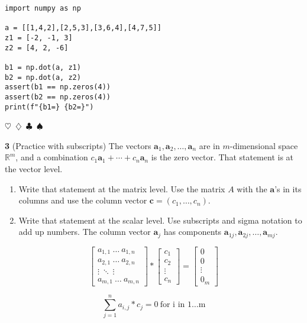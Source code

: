 \documentclass{article}
\newcommand{\sep}{\begin{center}$\heartsuit$~$\diamondsuit$~$\clubsuit$~$\spadesuit$\end{center}}
\newcommand{\vect}[1]{\ensuremath{\boldsymbol{#1}}}
\begin{document}
\begin{verbatim}
import numpy as np

a = [[1,4,2],[2,5,3],[3,6,4],[4,7,5]]
z1 = [-2, -1, 3]
z2 = [4, 2, -6]

b1 = np.dot(a, z1)
b2 = np.dot(a, z2)
assert(b1 == np.zeros(4))
assert(b2 == np.zeros(4))
print(f"{b1=} {b2=}")
\end{verbatim}

\sep

\noindent\textbf{3} (Practice with subscripts) The vectors $\vect{a}_1, \vect{a}_2, \ldots , \vect{a}_n$ are in $m$-dimensional space $\mathbb{R}^m$, and a combination $c_1\vect{a}_1 + \cdots + c_n\vect{a}_n$ is the zero vector. That statement is at the vector level. 
\begin{enumerate}[label=(\arabic*)]
\item Write that statement at the matrix level. Use the matrix $A$ with the $\vect{a}$'s in its columns and use the column vector $\vect{c} = (c_1, \ldots, c_n)$.
\item Write that statement at the scalar level. Use subscripts and sigma notation to add up numbers. The column vector $\vect{a}_j$ has components $\vect{a}_{1j}, \vect{a}_{2j}, \ldots, \vect{a}_{mj}$.
\end{enumerate}

\begin{displaymath}
  \begin{bmatrix}
    a_{1,1} ~ \ldots ~ a_{1,n} \\
    a_{2,1} ~ \ldots ~ a_{2,n} \\
    \vdots ~ \ddots ~ \vdots \\
    a_{m,1} ~ \ldots ~ a_{m,n}
  \end{bmatrix}
  * \begin{bmatrix} c_1 \\ c_2 \\ \vdots \\ c_n \end{bmatrix}
  = \begin{bmatrix} 0 \\ 0 \\ \vdots \\ 0_m \end{bmatrix}
\end{displaymath}

\begin{displaymath}
  \sum_{j=1}^{n} a_{i,j} * c_j = 0 ~ \text{for i in 1\ldots m}
\end{displaymath}
\end{document}
